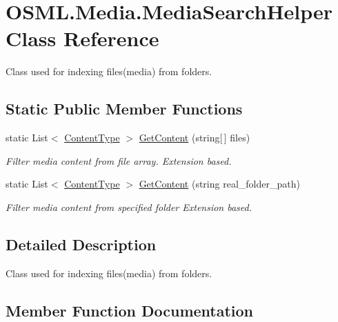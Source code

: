 \hypertarget{classOSML_1_1Media_1_1MediaSearchHelper}{}\section{O\+S\+M\+L.\+Media.\+Media\+Search\+Helper Class Reference}
\label{classOSML_1_1Media_1_1MediaSearchHelper}


Class used for indexing files(media) from folders.  


\subsection*{Static Public Member Functions}
\begin{DoxyCompactItemize}
\item 
static List$<$ \mbox{\hyperlink{classOSML_1_1Media_1_1ContentType}{Content\+Type}} $>$ \mbox{\hyperlink{classOSML_1_1Media_1_1MediaSearchHelper_a4ccacfea8414fb616b23963443bf4988}{Get\+Content}} (string\mbox{[}$\,$\mbox{]} files)
\begin{DoxyCompactList}\small\item\em Filter media content from file array. Extension based. \end{DoxyCompactList}\item 
static List$<$ \mbox{\hyperlink{classOSML_1_1Media_1_1ContentType}{Content\+Type}} $>$ \mbox{\hyperlink{classOSML_1_1Media_1_1MediaSearchHelper_a066a32f98635b3f7d6672856923e1599}{Get\+Content}} (string real\+\_\+folder\+\_\+path)
\begin{DoxyCompactList}\small\item\em Filter media content from specified folder Extension based. \end{DoxyCompactList}\end{DoxyCompactItemize}


\subsection{Detailed Description}
Class used for indexing files(media) from folders. 



\subsection{Member Function Documentation}
\mbox{\label{classOSML_1_1Media_1_1MediaSearchHelper_a4ccacfea8414fb616b23963443bf4988}} 

